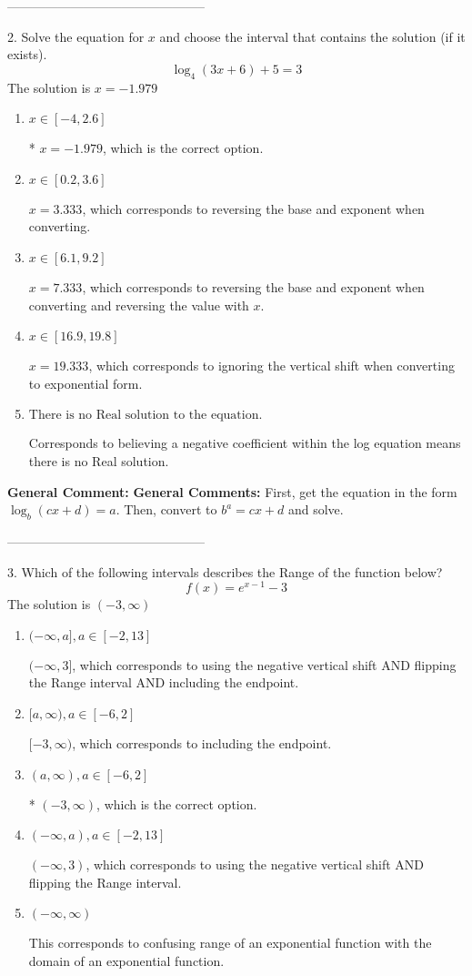\documentclass{extbook}[14pt]
\begin{document}
-----------------------------------------------

2. Solve the equation for $x$ and choose the interval that contains the solution (if it exists).
\[ \log_{4}{(3x+6)}+5 = 3 \] 
The solution is $ x = -1.979 $ 

\begin{enumerate}[label=\Alph*.] 
\item $ x \in [-4, 2.6] $ 

 * $x = -1.979$, which is the correct option. 
\item $ x \in [0.2, 3.6] $ 

 $x = 3.333$, which corresponds to reversing the base and exponent when converting. 
\item $ x \in [6.1, 9.2] $ 

 $x = 7.333$, which corresponds to reversing the base and exponent when converting and reversing the value with $x$. 
\item $ x \in [16.9, 19.8] $ 

 $x = 19.333$, which corresponds to ignoring the vertical shift when converting to exponential form. 
\item $ \text{There is no Real solution to the equation.} $ 

 Corresponds to believing a negative coefficient within the log equation means there is no Real solution. 
\end{enumerate} 
 
\textbf{General Comment:} \textbf{General Comments:} First, get the equation in the form $\log_b{(cx+d)} = a$. Then, convert to $b^a = cx+d$ and solve. 

-----------------------------------------------

3. Which of the following intervals describes the Range of the function below?
\[ f(x) = e^{x-1}-3 \] 
The solution is $ (-3, \infty) $ 

\begin{enumerate}[label=\Alph*.] 
\item $ (-\infty, a], a \in [-2, 13] $ 

 $(-\infty, 3]$, which corresponds to using the negative vertical shift AND flipping the Range interval AND including the endpoint. 
\item $ [a, \infty), a \in [-6, 2] $ 

 $[-3, \infty)$, which corresponds to including the endpoint. 
\item $ (a, \infty), a \in [-6, 2] $ 

 * $(-3, \infty)$, which is the correct option. 
\item $ (-\infty, a), a \in [-2, 13] $ 

 $(-\infty, 3)$, which corresponds to using the negative vertical shift AND flipping the Range interval. 
\item $ (-\infty, \infty) $ 

 This corresponds to confusing range of an exponential function with the domain of an exponential function. 
\end{enumerate} 
 
\end{document}
